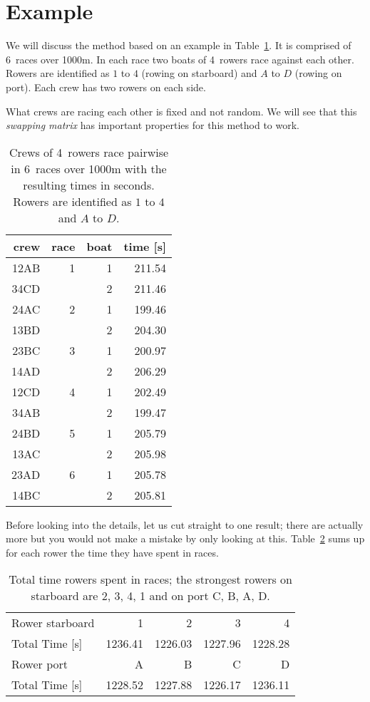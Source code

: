 \documentclass[a4paper,11pt]{article}
\begin{document}
\section{Example}

We will discuss the method based on an example \cite{purcer:dataset} in
Table~\ref{tab:races}. It is comprised of 6~races over 1000m. In each
race two boats of 4~rowers race against each other. Rowers are
identified as $1$ to $4$ (rowing on starboard) and $A$ to $D$ (rowing on
port). Each crew has two rowers on each side.

What crews are racing each other is fixed and not random. We will see
that this \emph{swapping matrix} has important properties for this
method to work.

\begin{table}[ht]
\centering
\begin{tabular}{rrrr}
  \toprule
 crew & race & boat & time [s] \\ 
  \midrule
 12AB &   1 & 1 & 211.54 \\ 
 34CD &     & 2 & 211.46 \\ [.8ex]
 24AC &   2 & 1 & 199.46 \\ 
 13BD &     & 2 & 204.30 \\ [.8ex]
 23BC &   3 & 1 & 200.97 \\ 
 14AD &     & 2 & 206.29 \\ [.8ex]
 12CD &   4 & 1 & 202.49 \\ 
 34AB &     & 2 & 199.47 \\ [.8ex]
 24BD &   5 & 1 & 205.79 \\ 
 13AC &     & 2 & 205.98 \\ [.8ex]
 23AD &   6 & 1 & 205.78 \\ 
 14BC &     & 2 & 205.81 \\ 
   \bottomrule
\end{tabular}
  \caption{\label{tab:races} Crews of 4~rowers race pairwise in 6~races
  over 1000m with the resulting times in seconds. Rowers are identified
  as $1$ to $4$ and $A$ to $D$.}
\end{table}

\iffalse
Before looking into the details, let us cut straight to one result; there
are actually more but you would not make a mistake by only looking at
this. Table~\ref{tab:basic} sums up for each rower the time they have
spent in races.

\begin{table}[ht]
\centering
\begin{tabular}{l rrrr}
  \toprule
Rower starboard & 1 & 2 & 3 & 4 \\
Total Time [s]  & 1236.41 & 1226.03 & 1227.96 & 1228.28 \\
  \midrule
Rower port      & A & B & C & D \\ 
Total Time [s]  & 1228.52 & 1227.88 & 1226.17 & 1236.11 \\ 
  \bottomrule
\end{tabular}
  \caption{\label{tab:basic} Total time rowers spent in races; the
  strongest rowers on starboard are 2, 3, 4, 1 and on port C, B, A, D.}
\end{table}
\end{document}
